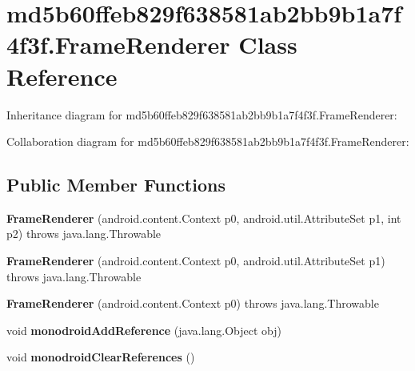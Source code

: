 \hypertarget{classmd5b60ffeb829f638581ab2bb9b1a7f4f3f_1_1_frame_renderer}{}\section{md5b60ffeb829f638581ab2bb9b1a7f4f3f.\+Frame\+Renderer Class Reference}
\label{classmd5b60ffeb829f638581ab2bb9b1a7f4f3f_1_1_frame_renderer}


Inheritance diagram for md5b60ffeb829f638581ab2bb9b1a7f4f3f.\+Frame\+Renderer\+:


Collaboration diagram for md5b60ffeb829f638581ab2bb9b1a7f4f3f.\+Frame\+Renderer\+:
\subsection*{Public Member Functions}
\begin{DoxyCompactItemize}
\item 
\mbox{\label{classmd5b60ffeb829f638581ab2bb9b1a7f4f3f_1_1_frame_renderer_a985beedccde288d3e108b2fbc0ac7eb9}} 
{\bfseries Frame\+Renderer} (android.\+content.\+Context p0, android.\+util.\+Attribute\+Set p1, int p2)  throws java.\+lang.\+Throwable 	
\item 
\mbox{\label{classmd5b60ffeb829f638581ab2bb9b1a7f4f3f_1_1_frame_renderer_ab87d8b45ebd480c87ae285c0c10dccc9}} 
{\bfseries Frame\+Renderer} (android.\+content.\+Context p0, android.\+util.\+Attribute\+Set p1)  throws java.\+lang.\+Throwable 	
\item 
\mbox{\label{classmd5b60ffeb829f638581ab2bb9b1a7f4f3f_1_1_frame_renderer_a4f57e2437910b58d5918efe5a2232974}} 
{\bfseries Frame\+Renderer} (android.\+content.\+Context p0)  throws java.\+lang.\+Throwable 	
\item 
\mbox{\label{classmd5b60ffeb829f638581ab2bb9b1a7f4f3f_1_1_frame_renderer_a2178330cfbb272c1b56a10b5cc406576}} 
void {\bfseries monodroid\+Add\+Reference} (java.\+lang.\+Object obj)
\item 
\mbox{\label{classmd5b60ffeb829f638581ab2bb9b1a7f4f3f_1_1_frame_renderer_a9122665ff96453c943de70afacc24f32}} 
void {\bfseries monodroid\+Clear\+References} ()
\end{DoxyCompactItemize}
